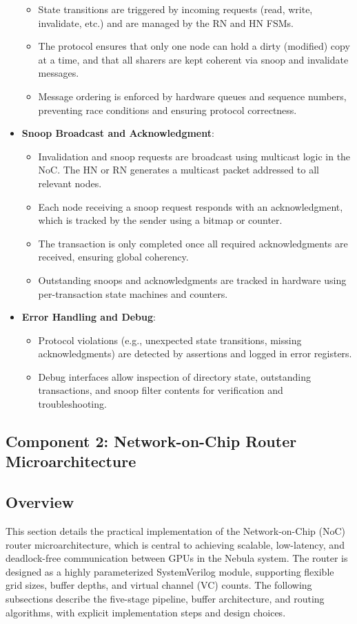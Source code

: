 \documentclass[11pt,a4paper]{article}
\begin{document}
\begin{itemize}
\begin{itemize}
        \item State transitions are triggered by incoming requests (read, write, invalidate, etc.) and are managed by the RN and HN FSMs.
        \item The protocol ensures that only one node can hold a dirty (modified) copy at a time, and that all sharers are kept coherent via snoop and invalidate messages.
        \item Message ordering is enforced by hardware queues and sequence numbers, preventing race conditions and ensuring protocol correctness.
    \end{itemize}
    \item \textbf{Snoop Broadcast and Acknowledgment}:
    \begin{itemize}
        \item Invalidation and snoop requests are broadcast using multicast logic in the NoC. The HN or RN generates a multicast packet addressed to all relevant nodes.
        \item Each node receiving a snoop request responds with an acknowledgment, which is tracked by the sender using a bitmap or counter.
        \item The transaction is only completed once all required acknowledgments are received, ensuring global coherency.
        \item Outstanding snoops and acknowledgments are tracked in hardware using per-transaction state machines and counters.
    \end{itemize}
    \item \textbf{Error Handling and Debug}:
    \begin{itemize}
        \item Protocol violations (e.g., unexpected state transitions, missing acknowledgments) are detected by assertions and logged in error registers.
        \item Debug interfaces allow inspection of directory state, outstanding transactions, and snoop filter contents for verification and troubleshooting.
    \end{itemize}
\end{itemize}

\subsection{Component 2: Network-on-Chip Router Microarchitecture}

\subsection*{Overview}
This section details the practical implementation of the Network-on-Chip (NoC) router microarchitecture, which is central to achieving scalable, low-latency, and deadlock-free communication between GPUs in the Nebula system. The router is designed as a highly parameterized SystemVerilog module, supporting flexible grid sizes, buffer depths, and virtual channel (VC) counts. The following subsections describe the five-stage pipeline, buffer architecture, and routing algorithms, with explicit implementation steps and design choices.
\end{document}

